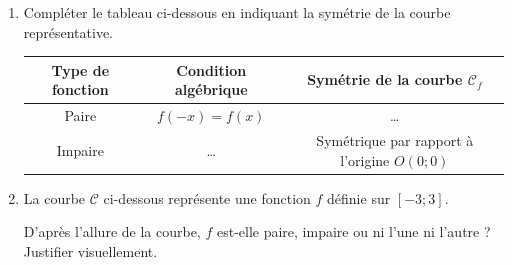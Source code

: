 \documentclass[11pt]{article}
\begin{document}
\begin{exercice}
\begin{enumerate}
    \item Compléter le tableau ci-dessous en indiquant la symétrie de la courbe représentative.
    \begin{center}
    \begin{tabular}{|c|c|c|}
    \hline
    Type de fonction & Condition algébrique & Symétrie de la courbe $\mathcal{C}_f$ \\
    \hline
    Paire & $f(-x)=f(x)$ & \ldots \\
    \hline
    Impaire & \ldots & Symétrique par rapport à l'origine $O(0;0)$ \\
    \hline
    \end{tabular}
    \end{center}
    \item La courbe $\mathcal{C}$ ci-dessous représente une fonction $f$ définie sur $[-3;3]$.
    \begin{center}
    \end{center}
    D'après l'allure de la courbe, $f$ est-elle paire, impaire ou ni l'une ni l'autre ? Justifier visuellement.
\end{enumerate}
\end{exercice}
\end{document}

